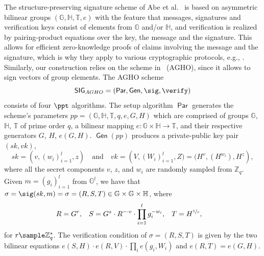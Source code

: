 \documentclass[runningheads]{llncs}
\newcommand{\Z}{\mathbb{Z}}
\DeclareMathOperator{\param}{\mathsf{Par}}
\DeclareMathOperator{\gen}{\mathsf{Gen}}
\begin{document}
The structure-preserving signature scheme of Abe et al.~\cite{AFGHO:2010,AGHO:2011} is based on asymmetric bilinear groups $(\mathbb G, \mathbb H, \mathbb T, e)$  with the feature that messages, signatures and verification keys consist of elements from $\mathbb G$ and/or  $\mathbb H$,  and verification is realized by pairing-product equations over the key, the message and the signature.
This allows for efficient zero-knowledge proofs of claims involving the message and the signature, which is why they apply to various cryptographic protocols, e.g., \cite{AFGHO:2010,fuhasl15,fuhasl18,towardsEABC}.
Similarly, our construction relies on the scheme in~\cite{AGHO:2011} (AGHO), since it allows to sign vectors of group elements.
The AGHO scheme 
\[
\textsf{SIG}_{AGHO} = (\param, \gen, \sig,\verify)
\]
consists of four $\ppt$ algorithms. 
The setup algorithm $\param$ generates the scheme's parameters  $pp=\left(\mathbb G,\mathbb H,\mathbb T, q,e, G, H\right)$  which are comprised of groups $\mathbb G$, $\mathbb H$,  $\mathbb T$ of prime order $q$, a bilinear mapping $e: \mathbb G\times \mathbb H\longrightarrow \mathbb T$, and their respective generators $G$, $H$, $e(G,H)$.
$\gen(pp)$ produces a private-public key pair $(sk,vk)$,
\[
sk =\left(v,(w_i)_{i=1}^l,z\right) \quad\text{and}\quad
 vk = \left(V, (W_i)_{i=1}^l, Z) = (H^v, (H^{w_i}), H^z\right),
\]
where all the secret components $v$, $z$, and $w_i$ are randomly sampled from $\Z_q$.
Given $m=(g_i)_{i=1}^l$ from $\mathbb G^l$, we have that $\sigma= \sig(sk,m)=\sigma =(R,S,T)\in \mathbb G\times \mathbb G\times \mathbb H$,  where
\begin{align*}
R &=G^r, 
&
S &= G^{z}\cdot R^{-\cdot v}\cdot \prod_{i=1}^l g_i^{-w_i},
&
T &=H^{\nicefrac{1}{r}},
\end{align*}
for $r\sample\Z_q^*$.
The verification condition of $\sigma=(R,S,T)$  is given by the two bilinear equations $e(S,H)\cdot  e(R,V)\cdot \prod_i e(g_i,W_i) $ and $e(R,T)=e(G,H)$.
\end{document}
